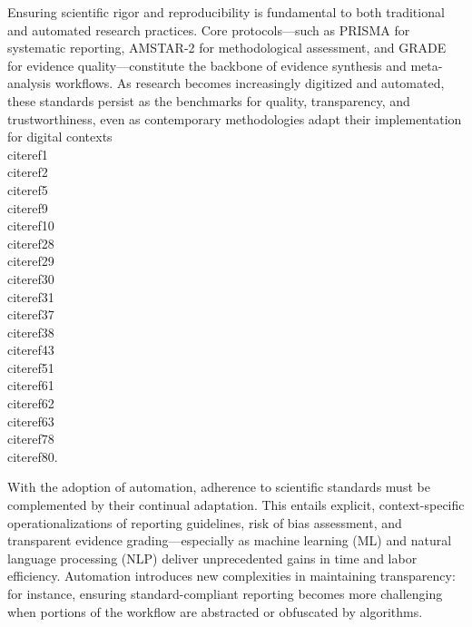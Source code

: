 \documentclass[11pt]{article}
\begin{document}
Ensuring scientific rigor and reproducibility is fundamental to both traditional and automated research practices. Core protocols—such as PRISMA for systematic reporting, AMSTAR-2 for methodological assessment, and GRADE for evidence quality—constitute the backbone of evidence synthesis and meta-analysis workflows. As research becomes increasingly digitized and automated, these standards persist as the benchmarks for quality, transparency, and trustworthiness, even as contemporary methodologies adapt their implementation for digital contexts \\cite{ref1}\\cite{ref2}\\cite{ref5}\\cite{ref9}\\cite{ref10}\\cite{ref28}\\cite{ref29}\\cite{ref30}\\cite{ref31}\\cite{ref37}\\cite{ref38}\\cite{ref43}\\cite{ref51}\\cite{ref61}\\cite{ref62}\\cite{ref63}\\cite{ref78}\\cite{ref80}.

With the adoption of automation, adherence to scientific standards must be complemented by their continual adaptation. This entails explicit, context-specific operationalizations of reporting guidelines, risk of bias assessment, and transparent evidence grading—especially as machine learning (ML) and natural language processing (NLP) deliver unprecedented gains in time and labor efficiency. Automation introduces new complexities in maintaining transparency: for instance, ensuring standard-compliant reporting becomes more challenging when portions of the workflow are abstracted or obfuscated by algorithms.
\end{document}
